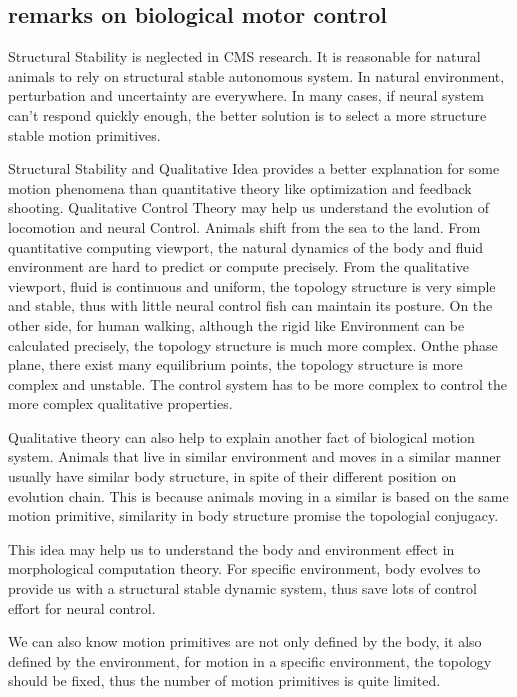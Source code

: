 \subsection{remarks on biological motor control}
Structural Stability is neglected in CMS research.
It is reasonable for natural animals to rely on structural stable autonomous system. 
In natural environment, perturbation and uncertainty are everywhere. In many cases, if neural system
can’t respond quickly enough, the better solution is to select a more structure stable motion primitives.

Structural Stability and Qualitative Idea provides a better explanation for some motion phenomena than quantitative theory like optimization and feedback shooting.
Qualitative Control Theory may help us understand the evolution of locomotion and neural Control.
Animals shift from the sea to the land. From quantitative computing viewport, the natural dynamics of the body and fluid environment are hard to predict or compute precisely. From the qualitative viewport, fluid is continuous
and uniform, the topology structure is very simple and stable, thus with little neural control fish can maintain its posture. On the other side, for human walking, although the rigid like
Environment can be calculated precisely, the topology structure is much more complex. 
Onthe phase plane, there exist many equilibrium points, the topology structure is more complex and unstable. 
The control system has to be more complex to control the more complex qualitative properties.

Qualitative theory can also help to explain another fact of biological motion system. 
Animals that live in similar environment and moves in a similar manner usually have similar body structure, in spite of their different position on evolution chain. 
This is because animals moving in a similar is based on the same motion primitive, similarity in body structure promise the topologial conjugacy.

This idea may help us to understand the body and environment effect in morphological computation theory. 
For specific environment, body evolves to provide us with a structural stable dynamic system, thus save lots of control effort for neural control.

We can also know motion primitives are not only defined by the body, it also defined by the environment, for motion in a specific environment, the topology should be fixed, thus the number of motion primitives is quite limited.


